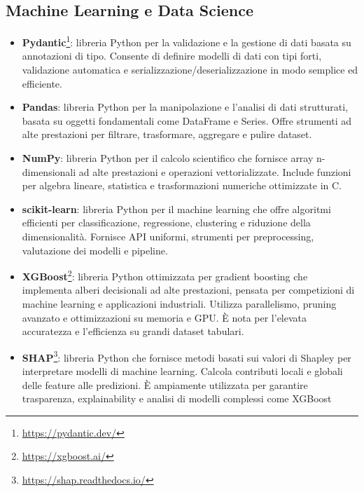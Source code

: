 \subsection{Machine Learning e Data Science}
\begin{itemize}
    \item \textbf{Pydantic}\footnote{\url{https://pydantic.dev/}}: libreria Python per la validazione e la gestione di dati basata su annotazioni di tipo. Consente di definire modelli di dati con tipi forti, validazione automatica e serializzazione/deserializzazione in modo semplice ed efficiente.
    \item \textbf{Pandas}: libreria Python per la manipolazione e l’analisi di dati strutturati, basata su oggetti fondamentali come DataFrame e Series. Offre strumenti ad alte prestazioni per filtrare, trasformare, aggregare e pulire dataset.
    \item \textbf{NumPy}: libreria Python per il calcolo scientifico che fornisce array n-dimensionali ad alte prestazioni e operazioni vettorializzate. Include funzioni per algebra lineare, statistica e trasformazioni numeriche ottimizzate in C.
    \item \textbf{scikit-learn}: libreria Python per il machine learning che offre algoritmi efficienti per classificazione, regressione, clustering e riduzione della dimensionalità. Fornisce API uniformi, strumenti per preprocessing, valutazione dei modelli e pipeline.
    \item \textbf{XGBoost}\footnote{\url{https://xgboost.ai/}}: libreria Python ottimizzata per gradient boosting che implementa alberi decisionali ad alte prestazioni, pensata per competizioni di machine learning e applicazioni industriali. Utilizza parallelismo, pruning avanzato e ottimizzazioni su memoria e GPU. È nota per l’elevata accuratezza e l’efficienza su grandi dataset tabulari.
    \item \textbf{SHAP}\footnote{\url{https://shap.readthedocs.io/}}: libreria Python che fornisce metodi basati sui valori di Shapley per interpretare modelli di machine learning. Calcola contributi locali e globali delle feature alle predizioni. È ampiamente utilizzata per garantire trasparenza, explainability e analisi di modelli complessi come XGBoost
\end{itemize}

